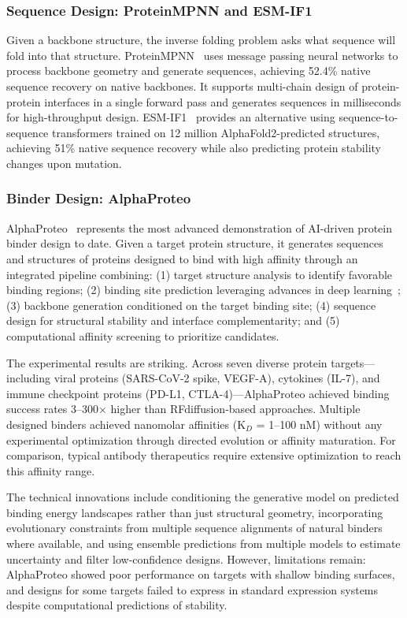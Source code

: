 \subsubsection{Sequence Design: ProteinMPNN and ESM-IF1}

Given a backbone structure, the inverse folding problem asks what sequence will fold into that structure. ProteinMPNN~\citep{dauparas2022proteinmpnn} uses message passing neural networks to process backbone geometry and generate sequences, achieving 52.4\% native sequence recovery on native backbones. It supports multi-chain design of protein-protein interfaces in a single forward pass and generates sequences in milliseconds for high-throughput design. ESM-IF1~\citep{hsu2022esmif1} provides an alternative using sequence-to-sequence transformers trained on 12 million AlphaFold2-predicted structures, achieving 51\% native sequence recovery while also predicting protein stability changes upon mutation.

\subsubsection{Binder Design: AlphaProteo}

AlphaProteo~\citep{zambaldi2024alphaproteo} represents the most advanced demonstration of AI-driven protein binder design to date. Given a target protein structure, it generates sequences and structures of proteins designed to bind with high affinity through an integrated pipeline combining: (1) target structure analysis to identify favorable binding regions; (2) binding site prediction leveraging advances in deep learning~\citep{zeng2020binding}; (3) backbone generation conditioned on the target binding site; (4) sequence design for structural stability and interface complementarity; and (5) computational affinity screening to prioritize candidates.

The experimental results are striking. Across seven diverse protein targets---including viral proteins (SARS-CoV-2 spike, VEGF-A), cytokines (IL-7), and immune checkpoint proteins (PD-L1, CTLA-4)---AlphaProteo achieved binding success rates 3--300$\times$ higher than RFdiffusion-based approaches. Multiple designed binders achieved nanomolar affinities (K$_D$ = 1--100 nM) without any experimental optimization through directed evolution or affinity maturation. For comparison, typical antibody therapeutics require extensive optimization to reach this affinity range.

The technical innovations include conditioning the generative model on predicted binding energy landscapes rather than just structural geometry, incorporating evolutionary constraints from multiple sequence alignments of natural binders where available, and using ensemble predictions from multiple models to estimate uncertainty and filter low-confidence designs. However, limitations remain: AlphaProteo showed poor performance on targets with shallow binding surfaces, and designs for some targets failed to express in standard expression systems despite computational predictions of stability.

